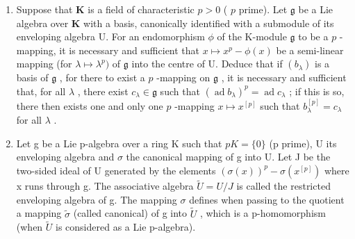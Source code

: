 \begin{enumerate}
\def\labelenumi{\arabic{enumi}.}
\setcounter{enumi}{4}
\item
  Suppose that \(\mathbf{K}\) is a field of characteristic \(p > 0\) ( \(p\) prime). Let \(\mathfrak{g}\) be a Lie algebra over \(\mathbf{K}\) with a basis, canonically identified with a submodule of its enveloping algebra U. For an endomorphism \(\phi\) of the K-module \(\mathfrak{g}\) to be a \(p\) -mapping, it is necessary and sufficient that \(x \mapsto x^p - \phi(x)\) be a semi-linear mapping (for \(\lambda \mapsto \lambda^p)\) of \(\mathfrak{g}\) into the centre of U. Deduce that if \((b_{\lambda})\) is a basis of \(\mathfrak{g}\) , for there to exist a \(p\) -mapping on \(\mathfrak{g}\) , it is necessary and sufficient that, for all \(\lambda\) , there exist \(c_{\lambda} \in \mathfrak{g}\) such that \((\operatorname{ad} b_{\lambda})^p = \operatorname{ad} c_{\lambda}\) ; if this is so, there then exists one and only one \(p\) -mapping \(x \mapsto x^{[p]}\) such that \(b_{\lambda}^{[p]} = c_{\lambda}\) for all \(\lambda\) .
\item
  Let g be a Lie p-algebra over a ring K such that \(pK = \{0\}\) (p prime), U its enveloping algebra and \(\sigma\) the canonical mapping of g into U. Let J be the two-sided ideal of U generated by the elements \((\sigma(x))^{p} - \sigma(x^{[p]})\) where x runs through g. The associative algebra \(\tilde{U} = U/J\) is called the restricted enveloping algebra of g. The mapping \(\sigma\) defines when passing to the quotient a mapping \(\tilde{\sigma}\) (called canonical) of g into \(\tilde{U}\) , which is a p-homomorphism (when \(\tilde{U}\) is considered as a Lie p-algebra).
\end{enumerate}

